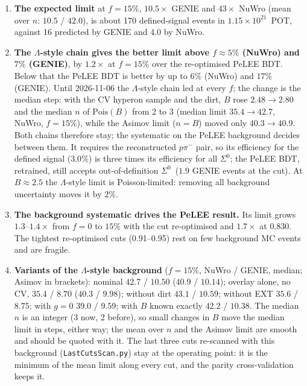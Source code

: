 \documentclass[11pt,a4paper]{article}
\newcommand{\Szero}{\ensuremath{\Sigma^{0}}}
\newcommand{\Lam}{\ensuremath{\Lambda}}
\begin{document}
\begin{enumerate}
  \item \textbf{The expected limit} at $f=15\%$, $10.5\times$ GENIE and $43\times$ NuWro
        (mean over $n$: $10.5$ / $42.0$), is about 170 defined-signal events in
        $1.15\times10^{21}$~POT, against 16 predicted by GENIE and 4.0 by NuWro.
  \item \textbf{The \Lam-style chain gives the better limit above $f\approx5\%$ (NuWro) and
        $7\%$ (GENIE)}, by $1.2\times$ at $f=15\%$ over the re-optimised PeLEE BDT. Below that the
        PeLEE BDT is better by up to $6\%$ (NuWro) and $17\%$ (GENIE). Until 2026-11-06 the
        \Lam-style chain led at every $f$; the change is the median step: with the CV hyperon
        sample and the dirt, $B$ rose $2.48\to2.80$ and the median $n$ of $\mathrm{Pois}(B)$ from
        2 to 3 (median limit $35.4\to42.7$, NuWro, $f=15\%$), while the Asimov limit ($n=B$)
        moved only $40.3\to40.9$. Both chains therefore stay; the systematic on the PeLEE
        background decides between them. It requires the reconstructed
        $p\pi^-$ pair, so its efficiency for the defined signal ($3.0\%$) is three times its
        efficiency for all \Szero; the PeLEE BDT, retrained, still accepts out-of-definition
        \Szero\ ($1.9$ GENIE events at the cut). At $B\approx2.5$ the \Lam-style limit is
        Poisson-limited: removing all background uncertainty moves it by $2\%$.
  \item \textbf{The background systematic drives the PeLEE result.} Its limit grows
        $1.3$--$1.4\times$ from $f=0$ to $15\%$ with the cut re-optimised and $1.7\times$ at
        0.830. The tightest re-optimised cuts (0.91--0.95) rest on few background MC events
        and are fragile.
  \item \textbf{Variants of the \Lam-style background} ($f=15\%$, NuWro / GENIE, median;
        Asimov in brackets): nominal $42.7$ / $10.50$ ($40.9$ / $10.14$); overlay alone, no CV,
        $35.4$ / $8.70$ ($40.3$ / $9.98$); without dirt $43.1$ / $10.59$; without EXT $35.6$ /
        $8.75$; with $g=0$ $39.0$ / $9.59$; with $B$ known exactly $42.2$ / $10.38$. The median
        $n$ is an integer (3 now, 2 before), so small changes in $B$ move the median limit in
        steps, either way; the mean over $n$ and the Asimov limit are smooth and should be
        quoted with it. The last three cuts re-scanned with this background
        (\texttt{LastCutsScan.py}) stay at the operating point: it is the minimum of the mean
        limit along every cut, and the parity cross-validation keeps it.
\end{enumerate}
\end{document}
